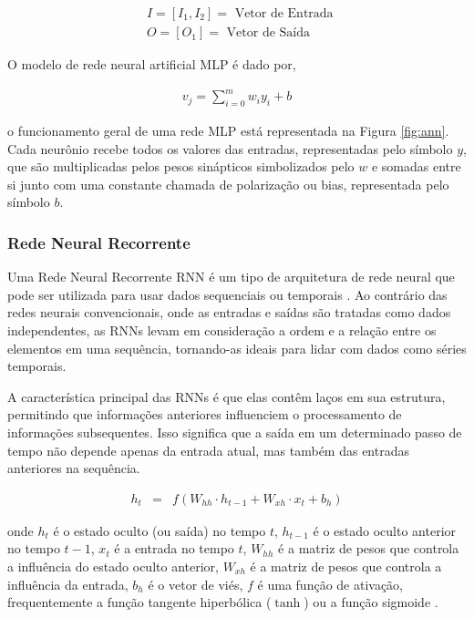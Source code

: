  \begin{equation}
 	\begin{aligned}
 		& I=\left[I_1, I_2\right]=\text { Vetor de Entrada } \\
 		& O=\left[O_1\right]=\text { Vetor de Saída }
 	\end{aligned} \nonumber
 \end{equation}
 
 O modelo de rede neural artificial MLP é dado por,
 
 \begin{eqnarray}
 	v_j=\sum_{i=0}^m w_i y_i+b\label{eq:ann}
 \end{eqnarray}
 
 \noindent o funcionamento geral de uma rede MLP está representada na Figura \ref{fig:ann}. Cada neurônio recebe todos os valores das entradas, representadas pelo símbolo $y$, que são multiplicadas pelos pesos sinápticos simbolizados pelo $w$ e somadas entre si junto com uma constante chamada de polarização ou bias, representada pelo símbolo $b$.
 
  \subsubsection{Rede Neural Recorrente}
  
 Uma Rede Neural Recorrente RNN é um tipo de arquitetura de rede neural que pode ser utilizada para usar dados sequenciais ou temporais \cite{NASIRI2023110867}. Ao contrário das redes neurais convencionais, onde as entradas e saídas são tratadas como dados independentes, as RNNs levam em consideração a ordem e a relação entre os elementos em uma sequência, tornando-as ideais para lidar com dados como séries temporais.
 
 A característica principal das RNNs é que elas contêm laços em sua estrutura, permitindo que informações anteriores influenciem o processamento de informações subsequentes. Isso significa que a saída em um determinado passo de tempo não depende apenas da entrada atual, mas também das entradas anteriores na sequência.
  
 \begin{eqnarray}
 	h_t &=& f(W_{hh} \cdot h_{t-1} + W_{xh} \cdot x_t + b_h)\label{eq:rnn}
 \end{eqnarray}
 
 \noindent onde $ h_t $ é o estado oculto (ou saída) no tempo $ t $, $ h_{t-1} $ é o estado oculto anterior no tempo $ t-1 $, $ x_t $ é a entrada no tempo $ t $, $ W_{hh} $ é a matriz de pesos que controla a influência do estado oculto anterior, $ W_{xh} $ é a matriz de pesos que controla a influência da entrada, $ b_h $ é o vetor de viés, $ f $ é uma função de ativação, frequentemente a função tangente hiperbólica ($\operatorname{tanh}$) ou a função sigmoide \cite{lstm}.
 
